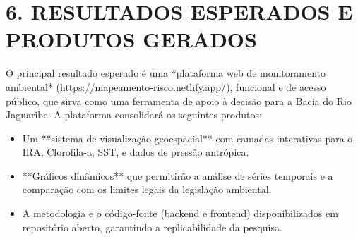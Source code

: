 \documentclass[12pt, a4paper]{article}
\begin{document}
\section*{6. RESULTADOS ESPERADOS E PRODUTOS GERADOS}
O principal resultado esperado é uma *plataforma web de monitoramento ambiental* (\url{https://mapeamento-risco.netlify.app/}), funcional e de acesso público, que sirva como uma ferramenta de apoio à decisão para a Bacia do Rio Jaguaribe. A plataforma consolidará os seguintes produtos:
\begin{itemize}
    \item Um **sistema de visualização geoespacial** com camadas interativas para o IRA, Clorofila-a, SST, e dados de pressão antrópica.
    \item **Gráficos dinâmicos** que permitirão a análise de séries temporais e a comparação com os limites legais da legislação ambiental.
    \item A metodologia e o código-fonte (backend e frontend) disponibilizados em repositório aberto, garantindo a replicabilidade da pesquisa.
\end{itemize}

\newpage


 
\end{document}
